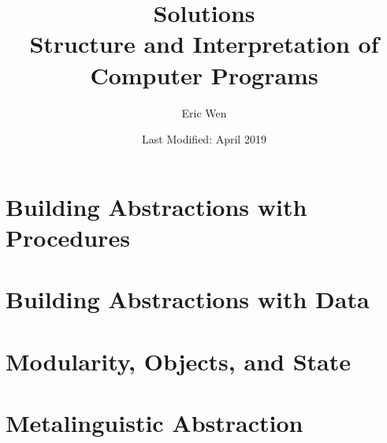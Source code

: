 \documentclass[a4paper]{book}
\begin{document}
\title{Solutions \\
\large Structure and Interpretation of Computer Programs}
\author{Eric Wen}
\date{Last Modified: April 2019}
\maketitle

\begin{multicols}{2}
  \tableofcontents
\end{multicols}

\def\codedir{./code}

%
%

\chapter{Building Abstractions with Procedures}



%
%

\chapter{Building Abstractions with Data}



%
%

\chapter{Modularity, Objects, and State}



%
%

\chapter{Metalinguistic Abstraction}


\end{document}
